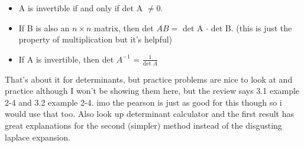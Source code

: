 \documentclass{report}
\begin{document}
\begin{multicols}{2}
\begin{itemize}
	\item A is invertible if and only if det A $ \neq 0 $.
	\item If B is also an $ n \times n $ matrix, then det $ AB = $ det A $\cdot$ det B. (this is just the property of multiplication but it's helpful)
	\item If A is invertible, then det $ A^{ -1 } $ = $ \frac{ 1 }{ \text{det }A }  $
\end{itemize}
That's about it for determinants, but practice problems are nice to look at and practice although I won't be showing them here, but the review says 3.1 example 2-4 and 3.2 example 2-4. imo the pearson is just as good for this though so i would use that too. Also look up determinant calculator and the first result has great explanations for the second (simpler) method instead of the disgusting laplace expansion.

\end{multicols}
\end{document}
